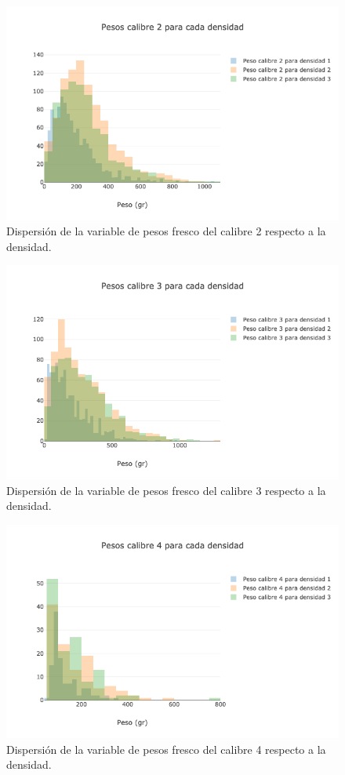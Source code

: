 \begin{figure}[h!]
	\centering
	\includegraphics[scale=0.5]{PD2.png}
	\caption{Dispersión de la variable de pesos fresco del calibre 2 respecto a la densidad.}
	\label{fig:pd2}
\end{figure}
\clearpage

\begin{figure}[h!]
	\centering
	\includegraphics[scale=0.5]{PD3.png}
	\caption{Dispersión de la variable de pesos fresco del calibre 3 respecto a la densidad.}
	\label{fig:pd3}
\end{figure}

\begin{figure}[h!]
	\centering
	\includegraphics[scale=0.5]{PD4.png}
	\caption{Dispersión de la variable de pesos fresco del calibre 4 respecto a la densidad.}
	\label{fig:pd4}
\end{figure}

